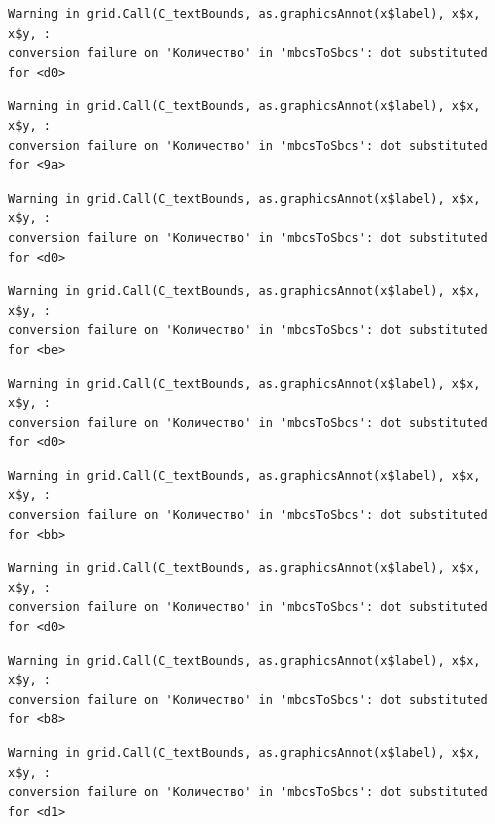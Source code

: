\documentclass[
  letterpaper,
  DIV=11,
  numbers=noendperiod]{scrreprt}
\theoremstyle{definition}
\theoremstyle{remark}
\begin{document}
\begin{verbatim}
Warning in grid.Call(C_textBounds, as.graphicsAnnot(x$label), x$x, x$y, :
conversion failure on 'Количество' in 'mbcsToSbcs': dot substituted for <d0>
\end{verbatim}

\begin{verbatim}
Warning in grid.Call(C_textBounds, as.graphicsAnnot(x$label), x$x, x$y, :
conversion failure on 'Количество' in 'mbcsToSbcs': dot substituted for <9a>
\end{verbatim}

\begin{verbatim}
Warning in grid.Call(C_textBounds, as.graphicsAnnot(x$label), x$x, x$y, :
conversion failure on 'Количество' in 'mbcsToSbcs': dot substituted for <d0>
\end{verbatim}

\begin{verbatim}
Warning in grid.Call(C_textBounds, as.graphicsAnnot(x$label), x$x, x$y, :
conversion failure on 'Количество' in 'mbcsToSbcs': dot substituted for <be>
\end{verbatim}

\begin{verbatim}
Warning in grid.Call(C_textBounds, as.graphicsAnnot(x$label), x$x, x$y, :
conversion failure on 'Количество' in 'mbcsToSbcs': dot substituted for <d0>
\end{verbatim}

\begin{verbatim}
Warning in grid.Call(C_textBounds, as.graphicsAnnot(x$label), x$x, x$y, :
conversion failure on 'Количество' in 'mbcsToSbcs': dot substituted for <bb>
\end{verbatim}

\begin{verbatim}
Warning in grid.Call(C_textBounds, as.graphicsAnnot(x$label), x$x, x$y, :
conversion failure on 'Количество' in 'mbcsToSbcs': dot substituted for <d0>
\end{verbatim}

\begin{verbatim}
Warning in grid.Call(C_textBounds, as.graphicsAnnot(x$label), x$x, x$y, :
conversion failure on 'Количество' in 'mbcsToSbcs': dot substituted for <b8>
\end{verbatim}

\begin{verbatim}
Warning in grid.Call(C_textBounds, as.graphicsAnnot(x$label), x$x, x$y, :
conversion failure on 'Количество' in 'mbcsToSbcs': dot substituted for <d1>
\end{verbatim}
\end{document}
